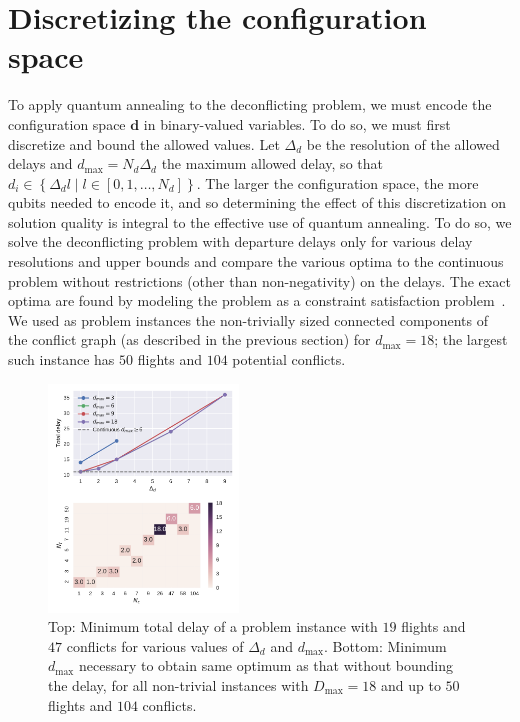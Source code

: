 \section{Discretizing the configuration space}
To apply quantum annealing to the deconflicting problem, we must encode the configuration space $\mathbf d$ in binary-valued variables.
To do so, we must first discretize and bound the allowed values.
Let $\Delta_d$ be the resolution of the allowed delays and $d_{\max} = N_d \Delta_d$ the maximum allowed delay, so that $d_i \in \left\{\Delta_d l \middle| l \in [0, 1, \ldots, N_d]\right\}$.
The larger the configuration space, the more qubits needed to encode it, and so determining the effect of this discretization on solution quality is integral to the effective use of quantum annealing.
To do so, we solve the deconflicting problem with departure delays only for various delay resolutions and upper bounds and compare the various optima to the continuous problem without restrictions (other than non-negativity) on the delays.
The exact optima are found by modeling the problem as a constraint satisfaction problem~\cite{numberjack}. 
We used as problem instances the non-trivially sized connected components of the conflict graph (as described in the previous section) for $d_{\max} = 18$; the largest such instance has $50$ flights and $104$ potential conflicts.

\begin{figure}[h]
\centering
\includegraphics[width=0.45\textwidth]{./pics/delay_only_cp_results.pdf}
\caption[Effect of discretization on solution quality]{Top: Minimum total delay of a problem instance with $19$ flights and $47$ conflicts for various values of $\Delta_d$ and $d_{\max}$.
    Bottom: Minimum $d_\text{max}$ necessary to obtain same optimum as that without bounding the delay, for all non-trivial instances with $D_\text{max}=18$ and up to $50$ flights and $104$ conflicts.}
\label{fig:delay_only_cp_results}
\end{figure}

